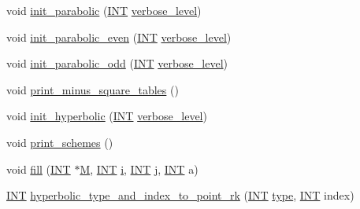 \begin{DoxyCompactItemize}
\item 
void \mbox{\hyperlink{classorthogonal_aef84a93f2f8973a3b5fc2d7d48b1d5ed}{init\+\_\+parabolic}} (\mbox{\hyperlink{galois_8h_a09fddde158a3a20bd2dcadb609de11dc}{I\+NT}} \mbox{\hyperlink{simeon_8_c_a818073fbcc2f439e7c56952f67386122}{verbose\+\_\+level}})
\item 
void \mbox{\hyperlink{classorthogonal_a495354fe027c383b4dd9ee3906dcde92}{init\+\_\+parabolic\+\_\+even}} (\mbox{\hyperlink{galois_8h_a09fddde158a3a20bd2dcadb609de11dc}{I\+NT}} \mbox{\hyperlink{simeon_8_c_a818073fbcc2f439e7c56952f67386122}{verbose\+\_\+level}})
\item 
void \mbox{\hyperlink{classorthogonal_adeb14ce7821acee632e1a1ca3975a201}{init\+\_\+parabolic\+\_\+odd}} (\mbox{\hyperlink{galois_8h_a09fddde158a3a20bd2dcadb609de11dc}{I\+NT}} \mbox{\hyperlink{simeon_8_c_a818073fbcc2f439e7c56952f67386122}{verbose\+\_\+level}})
\item 
void \mbox{\hyperlink{classorthogonal_a4e90d81717bfc7dcd9fd406f36c3057b}{print\+\_\+minus\+\_\+square\+\_\+tables}} ()
\item 
void \mbox{\hyperlink{classorthogonal_a29b6dc8054efd05033b2ef9cacca3a5e}{init\+\_\+hyperbolic}} (\mbox{\hyperlink{galois_8h_a09fddde158a3a20bd2dcadb609de11dc}{I\+NT}} \mbox{\hyperlink{simeon_8_c_a818073fbcc2f439e7c56952f67386122}{verbose\+\_\+level}})
\item 
void \mbox{\hyperlink{classorthogonal_ac3106df6f9ff358f2156b87fb72ca36b}{print\+\_\+schemes}} ()
\item 
void \mbox{\hyperlink{classorthogonal_a2c9abcf612036b37e206ae1f0718c6b2}{fill}} (\mbox{\hyperlink{galois_8h_a09fddde158a3a20bd2dcadb609de11dc}{I\+NT}} $\ast$\mbox{\hyperlink{plane__search_8_c_ad2d23ebd03187a91edd45b1d5e496265}{M}}, \mbox{\hyperlink{galois_8h_a09fddde158a3a20bd2dcadb609de11dc}{I\+NT}} \mbox{\hyperlink{alphabet2_8_c_acb559820d9ca11295b4500f179ef6392}{i}}, \mbox{\hyperlink{galois_8h_a09fddde158a3a20bd2dcadb609de11dc}{I\+NT}} \mbox{\hyperlink{alphabet2_8_c_a37d972ae0b47b9099e30983131d31916}{j}}, \mbox{\hyperlink{galois_8h_a09fddde158a3a20bd2dcadb609de11dc}{I\+NT}} a)
\item 
\mbox{\hyperlink{galois_8h_a09fddde158a3a20bd2dcadb609de11dc}{I\+NT}} \mbox{\hyperlink{classorthogonal_af31cd843ff2e6eb4fe1ba9c49e62d1b8}{hyperbolic\+\_\+type\+\_\+and\+\_\+index\+\_\+to\+\_\+point\+\_\+rk}} (\mbox{\hyperlink{galois_8h_a09fddde158a3a20bd2dcadb609de11dc}{I\+NT}} \mbox{\hyperlink{_l_i_b_2_g_a_l_o_i_s_2dlx_8_c_ad241c8005abf9f323e9fffec67f55abf}{type}}, \mbox{\hyperlink{galois_8h_a09fddde158a3a20bd2dcadb609de11dc}{I\+NT}} index)

\end{DoxyCompactItemize}
